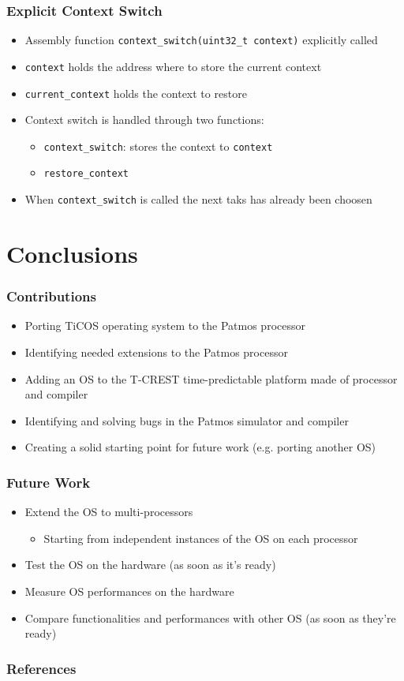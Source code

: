 \documentclass[notheorems]{beamer}
\begin{document}
\begin{frame}
\frametitle{Explicit Context Switch}
\begin{itemize}
	\item Assembly function \texttt{context\_switch(uint32\_t context)} explicitly called
	\item \texttt{context} holds the address where to store the current context
	\item \texttt{current\_context} holds the context to restore
	\item Context switch is handled through two functions:
		\begin{itemize}
			\item \texttt{context\_switch}: stores the context to \texttt{context}
			\item \texttt{restore\_context}
		\end{itemize}
	\item When \texttt{context\_switch} is called the next taks has already been choosen
\end{itemize}
\end{frame}

\section{Conclusions}
\begin{frame}
\frametitle{Contributions}
\begin{itemize}
	\item Porting TiCOS operating system to the Patmos processor
	\item Identifying needed extensions to the Patmos processor
	\item Adding an OS to the T-CREST time-predictable platform made of processor and compiler
	\item Identifying and solving bugs in the Patmos simulator and compiler
	\item Creating a solid starting point for future work (e.g. porting another OS)
\end{itemize}
\end{frame}

\begin{frame}
\frametitle{Future Work}
\begin{itemize}
	\item Extend the OS to multi-processors
	\begin{itemize}
		\item Starting from independent instances of the OS on each processor
	\end{itemize}
	\item Test the OS on the hardware (as soon as it's ready)
	\item Measure OS performances on the hardware
	\item Compare functionalities and performances with other OS (as soon as they're ready)
\end{itemize}
\end{frame}

\begin{frame}[allowframebreaks]
		\tiny
        \frametitle{References}
		
		
\end{frame}
\end{document}
